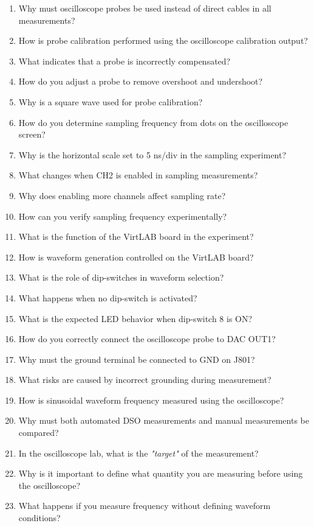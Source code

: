 \documentclass[../main.tex]{subfiles}
\begin{document}
\begin{enumerate}[label=\textbf{\arabic*.}]
	\item Why must oscilloscope probes be used instead of direct cables in all measurements?
	\item How is probe calibration performed using the oscilloscope calibration output?
	\item What indicates that a probe is incorrectly compensated?
	\item How do you adjust a probe to remove overshoot and undershoot?
	\item Why is a square wave used for probe calibration?
	\item How do you determine sampling frequency from dots on the oscilloscope screen?
	\item Why is the horizontal scale set to 5 ns/div in the sampling experiment?
	\item What changes when CH2 is enabled in sampling measurements?
	\item Why does enabling more channels affect sampling rate?
	\item How can you verify sampling frequency experimentally?
	\item What is the function of the VirtLAB board in the experiment?
	\item How is waveform generation controlled on the VirtLAB board?
	\item What is the role of dip-switches in waveform selection?
	\item What happens when no dip-switch is activated?
	\item What is the expected LED behavior when dip-switch 8 is ON?
	\item How do you correctly connect the oscilloscope probe to DAC OUT1?
	\item Why must the ground terminal be connected to GND on J801?
	\item What risks are caused by incorrect grounding during measurement?
	\item How is sinusoidal waveform frequency measured using the oscilloscope?
	\item Why must both automated DSO measurements and manual measurements be compared?
	\item In the oscilloscope lab, what is the \textit{"target"} of the measurement?
	\item Why is it important to define what quantity you are measuring before using the oscilloscope?
	\item What happens if you measure frequency without defining waveform conditions?

\end{enumerate}
\end{document}
